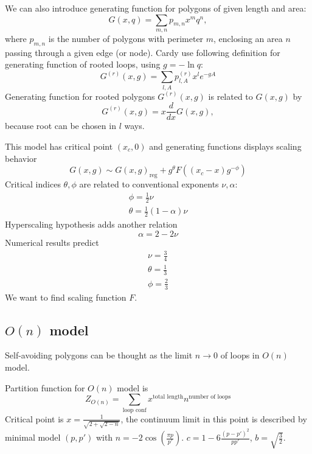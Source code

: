 \documentclass[12pt]{article}
\begin{document}
We can also introduce generating function for polygons of given length and area:
\begin{equation}
  \label{eq:75}
  G(x,q)=\sum_{m,n} p_{m,n} x^{m} q^{n},
\end{equation}
where $p_{m,n}$ is the number of polygons with perimeter $m$, enclosing an area $n$ passing through
a given edge (or node). 
Cardy \cite{cardy2001exact} use following definition for generating function of rooted loops, using
$g=-\ln q$:
\begin{equation}
  \label{eq:76}
  G^{(r)}(x,g)=\sum_{l,A} p_{l,A}^{(r)} x^{l} e^{-gA}
\end{equation}
Generating function for rooted polygons $G^{(r)}(x,g)$ is related to $G(x,g)$ by
\begin{equation}
  \label{eq:81}
  G^{(r)}(x,g)=x \frac{d}{dx} G(x,g),
\end{equation}
because root can be chosen in $l$ ways. 

This model has critical point $(x_{c},0)$ and generating functions displays scaling behavior
\begin{equation}
  \label{eq:77}
  G(x,g)\sim G(x,g)_{\mathrm{reg}}+g^{\theta} F\left((x_{c}-x)g^{-\phi}\right)
\end{equation}
Critical indices $\theta,\phi$ are related to conventional exponents $\nu,\alpha$:
\begin{eqnarray}
  \label{eq:78}
  \phi=\frac{1}{2}\nu\\
  \theta=\frac{1}{2}(1-\alpha) \nu
\end{eqnarray}
Hyperscaling hypothesis adds another relation
\begin{equation}
  \label{eq:79}
  \alpha=2-2\nu
\end{equation}
Numerical results predict
\begin{eqnarray}
  \label{eq:80}
  \nu=\frac{3}{4}\\
  \theta=\frac{1}{3}\\
  \phi=\frac{2}{3}
\end{eqnarray}
We want to find scaling function $F$.

\subsection{$O(n)$ model}
\label{sec:introduction-1}

Self-avoiding polygons can be thought as the limit $n\to 0$ of loops in $O(n)$ model.

Partition function for $O(n)$ model is
\begin{equation}
  \label{eq:9}
  Z_{O(n)} = \sum_{\mbox{loop conf}} x^{\mbox{total length}}
  n^{\mbox{number of loops}}
\end{equation}
Critical point is $x=\frac{1}{\sqrt{2+\sqrt{2-n}}}$, the continuum
limit in this point is described by minimal model $(p,p')$ with
$n=-2\cos\left(\frac{\pi p}{p'}\right)$. $c=1-6\frac{(p-p')^2}{pp'}$, $b=\sqrt{\frac{3}{2}}$.
\end{document}
